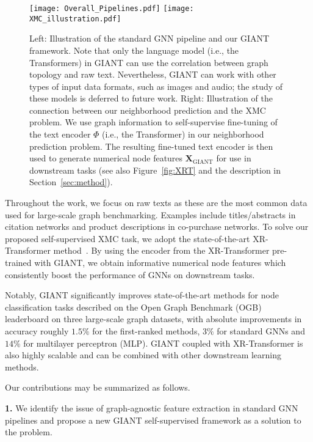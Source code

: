 \documentclass{article} \usepackage{iclr2022_conference,times}
\begin{document}
\begin{figure}[t]
    \centering
    \texttt{[image: Overall\_Pipelines.pdf]}
    \texttt{[image: XMC\_illustration.pdf]}
    \vspace{-0.5cm}
    \caption{Left: Illustration of the standard GNN pipeline and our GIANT framework. Note that only the language model (i.e., the Transformers) in GIANT can use the correlation between graph topology and raw text. Nevertheless, GIANT can work with other types of input data formats, such as images and audio; the study of these models is deferred to future work. Right: Illustration of the connection between our neighborhood prediction and the XMC problem. We use graph information to self-supervise fine-tuning of the text encoder $\Phi$ (i.e., the Transformer) in our neighborhood prediction problem. The resulting fine-tuned text encoder is then used to generate numerical node features $\mathbf{X}_{\text{GIANT}}$ for use in downstream tasks (see also Figure~\ref{fig:XRT} and the description in Section~\ref{sec:method}).}
    \label{fig:pipelines}
    \vspace{-0.3in}
\end{figure}

Throughout the work, we focus on raw texts as these are the most common data used for large-scale graph benchmarking. Examples include titles/abstracts in citation networks and product descriptions in co-purchase networks. To solve our proposed self-supervised XMC task, we adopt the state-of-the-art XR-Transformer method~\citep{jiong2021fast}. By using the encoder from the XR-Transformer pre-trained with GIANT, we obtain informative numerical node features which consistently boost the performance of GNNs on downstream tasks. 


Notably, GIANT significantly improves state-of-the-art methods for node classification tasks described on the Open Graph Benchmark (OGB)~\citep{hu2020open} leaderboard on three large-scale graph datasets, with absolute improvements in accuracy roughly $1.5\%$ for the first-ranked methods, $3\%$ for standard GNNs and $14\%$ for multilayer perceptron (MLP). GIANT coupled with XR-Transformer is also highly scalable and can be combined with other downstream learning methods.

Our contributions may be summarized as follows.

\textbf{1.} We identify the issue of graph-agnostic feature extraction in standard GNN pipelines and propose a new GIANT self-supervised framework as a solution to the problem.
\end{document}
